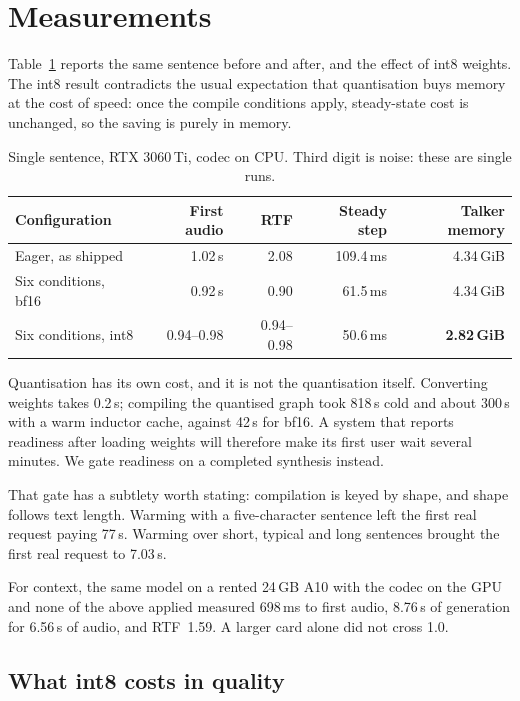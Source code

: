 \documentclass[11pt]{article}
\begin{document}
\section{Measurements}

Table~\ref{tab:main} reports the same sentence before and after, and the effect of int8 weights. The int8 result
contradicts the usual expectation that quantisation buys memory at the cost of speed: once the compile conditions
apply, steady-state cost is unchanged, so the saving is purely in memory.

\begin{table}[h]
\centering
\begin{tabular}{lrrrr}
\toprule
Configuration & First audio & RTF & Steady step & Talker memory \\
\midrule
Eager, as shipped & 1.02\,s & 2.08 & 109.4\,ms & 4.34\,GiB \\
Six conditions, bf16 & 0.92\,s & 0.90 & 61.5\,ms & 4.34\,GiB \\
Six conditions, int8 & 0.94--0.98 & 0.94--0.98 & 50.6\,ms & \textbf{2.82\,GiB} \\
\bottomrule
\end{tabular}
\caption{Single sentence, RTX 3060\,Ti, codec on CPU. Third digit is noise: these are single runs.}
\label{tab:main}
\end{table}

Quantisation has its own cost, and it is not the quantisation itself. Converting weights takes 0.2\,s; compiling
the quantised graph took 818\,s cold and about 300\,s with a warm inductor cache, against 42\,s for bf16. A system
that reports readiness after loading weights will therefore make its first user wait several minutes. We gate
readiness on a completed synthesis instead.

That gate has a subtlety worth stating: compilation is keyed by shape, and shape follows text length. Warming with
a five-character sentence left the first real request paying 77\,s. Warming over short, typical and long sentences
brought the first real request to 7.03\,s.

For context, the same model on a rented 24\,GB A10 with the codec on the GPU and none of the above applied
measured 698\,ms to first audio, 8.76\,s of generation for 6.56\,s of audio, and RTF~1.59. A larger card alone did
not cross 1.0.

\subsection{What int8 costs in quality}
\label{sec:int8}
\end{document}
